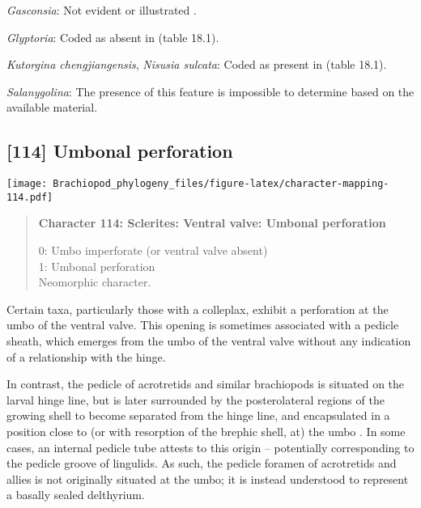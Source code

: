 \documentclass[openany]{book}
\theoremstyle{definition}
\theoremstyle{definition}
\theoremstyle{definition}
\theoremstyle{remark}
\begin{document}
\hypertarget{Gasconsia-coding-113}{}
\emph{Gasconsia}: Not evident or illustrated
\citep{Hanken1985Thetaxonomy}.

\hypertarget{Glyptoria-coding-113}{}
\emph{Glyptoria}: Coded as absent in
\citet{Bassett2001Functionalmorphology} (table 18.1).

\hypertarget{Kutorgina_chengjiangensis-coding-113}{}
\emph{Kutorgina chengjiangensis}, \emph{Nisusia sulcata}: Coded as
present in \citet{Bassett2001Functionalmorphology} (table 18.1).

\hypertarget{Salanygolina-coding-113}{}
\emph{Salanygolina}: The presence of this feature is impossible to
determine based on the available material.

\subsection*{{[}114{]} Umbonal perforation}\label{umbonal-perforation}

\texttt{[image: Brachiopod\_phylogeny\_files/figure-latex/character-mapping-114.pdf]}

\begin{quote}
\textbf{Character 114: Sclerites: Ventral valve: Umbonal perforation}

0: Umbo imperforate (or ventral valve absent)\\
1: Umbonal perforation\\
Neomorphic character.
\end{quote}

Certain taxa, particularly those with a colleplax, exhibit a perforation
at the umbo of the ventral valve. This opening is sometimes associated
with a pedicle sheath, which emerges from the umbo of the ventral valve
without any indication of a relationship with the hinge.

In contrast, the pedicle of acrotretids and similar brachiopods is
situated on the larval hinge line, but is later surrounded by the
posterolateral regions of the growing shell to become separated from the
hinge line, and encapsulated in a position close to (or with resorption
of the brephic shell, at) the umbo \citep[see][pp.~407--411 and fig. 3
for discussion]{Popov1992TheCambrian}. In some cases, an internal
pedicle tube attests to this origin -- potentially corresponding to the
pedicle groove of lingulids. As such, the pedicle foramen of acrotretids
and allies is not originally situated at the umbo; it is instead
understood to represent a basally sealed delthyrium.
\end{document}
